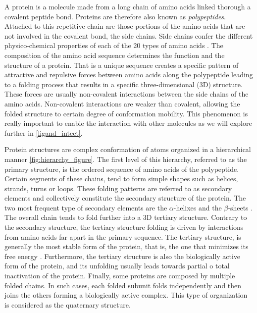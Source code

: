 \documentclass[11pt, b5paper,twoside]{tesi_upf}
\begin{document}
\par A protein is a molecule made from a long chain of amino acids linked thorough a covalent peptide bond. Proteins are therefore also known as \textit{polypeptides}. Attached to this repetitive chain are those portions of the amino acids that are not involved in the covalent bond, the side chains. Side chains confer the different physico-chemical properties of each of the 20 types of amino acids \cite{alberts2008molecular}. The composition of the amino acid sequence determines the function and the structure of a protein. That is a unique sequence creates a specific pattern of attractive and repulsive forces between amino acids along the polypeptide leading to a folding process that results in a specific three-dimensional (3D) structure. These forces are usually non-covalent  interactions between the side chains of the amino acids. Non-covalent interactions are weaker than covalent, allowing the folded structure to certain degree of  conformation mobility. This phenomenon is really important to enable the interaction with other molecules as we will explore further in \ref{ligand_intect}.
\par Protein structures are complex conformation of atoms organized in a hierarchical manner \ref{fig:hierarchy_figure}. The first level of this hierarchy, referred to as the primary structure, is the ordered sequence of amino acids of the polypeptide. Certain segments of these chains, tend to form simple shapes such as helices, strands, turns or loops.  These folding patterns are referred to as secondary elements and collectively constitute the secondary structure of the protein. The two most frequent type of secondary elements are the $\alpha$-helixes and the $\beta$-sheets \cite{DSSP}. The overall chain tends to fold further into a 3D tertiary structure. Contrary to the secondary structure, the tertiary structure folding is driven by interactions from amino acids far apart in the primary sequence. The tertiary structure, is generally the most stable form of the protein, that is, the one that minimizes its free energy \cite{Dill1990}. Furthermore, the tertiary structure is also the biologically active form of the protein, and its unfolding usually leads towards partial o total inactivation of the protein. Finally, some proteins are composed by multiple folded chains. In such cases, each folded subunit folds independently and then joins the others forming a biologically active complex. This type of organization is considered as the quaternary structure.
\end{document}
